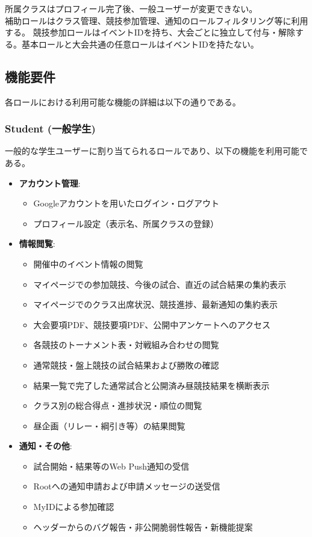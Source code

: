 \documentclass[paper=a4, fontsize=11pt]{jlreq}
\begin{document}
所属クラスはプロフィール完了後、一般ユーザーが変更できない。\\
補助ロールはクラス管理、競技参加管理、通知のロールフィルタリング等に利用する。
競技参加ロールはイベントIDを持ち、大会ごとに独立して付与・解除する。基本ロールと大会共通の任意ロールはイベントIDを持たない。

\subsection{機能要件}
各ロールにおける利用可能な機能の詳細は以下の通りである。

\subsubsection{Student (一般学生)}
一般的な学生ユーザーに割り当てられるロールであり、以下の機能を利用可能である。
\begin{itemize}
    \item \textbf{アカウント管理}:
    \begin{itemize}
        \item Googleアカウントを用いたログイン・ログアウト
        \item プロフィール設定（表示名、所属クラスの登録）
    \end{itemize}
    \item \textbf{情報閲覧}:
    \begin{itemize}
        \item 開催中のイベント情報の閲覧
        \item マイページでの参加競技、今後の試合、直近の試合結果の集約表示
        \item マイページでのクラス出席状況、競技進捗、最新通知の集約表示
        \item 大会要項PDF、競技要項PDF、公開中アンケートへのアクセス
        \item 各競技のトーナメント表・対戦組み合わせの閲覧
        \item 通常競技・盤上競技の試合結果および勝敗の確認
        \item 結果一覧で完了した通常試合と公開済み昼競技結果を横断表示
        \item クラス別の総合得点・進捗状況・順位の閲覧
        \item 昼企画（リレー・綱引き等）の結果閲覧
    \end{itemize}
    \item \textbf{通知・その他}:
    \begin{itemize}
        \item 試合開始・結果等のWeb Push通知の受信
        \item Rootへの通知申請および申請メッセージの送受信
        \item MyIDによる参加確認
        \item ヘッダーからのバグ報告・非公開脆弱性報告・新機能提案
    \end{itemize}
\end{itemize}
\end{document}
